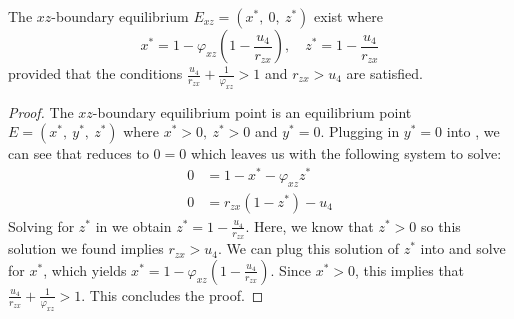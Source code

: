 \begin{theorem}\label{thm:boundary-xz-exist}
    The $xz$-boundary equilibrium $E_{xz}=\left(x^*,\ 0,\ z^*\right)$ exist where
    \begin{equation*}
        x^*=1-\varphi_{xz}\left(1-\frac{u_4}{r_{zx}}\right),\quad
        z^*=1-\frac{u_4}{r_{zx}}
    \end{equation*}
    provided that the conditions $\frac{u_4}{r_{zx}}+\frac{1}{\varphi_{xz}} > 1$ and $r_{zx}>u_4$ are satisfied.
\end{theorem}
\begin{proof}
    The $xz$-boundary equilibrium point is an equilibrium point $E=\left(x^*,\ y^*,\ z^*\right)$ where $x^*>0,\ z^*>0$ and $y^*=0$. Plugging in $y^*=0$ into , we can see that  reduces to $0=0$ which leaves us with the following system to solve:
    \begin{subequations}\label{system:xz-boundary}
        \begin{align}
            0 &= 1-x^*-\varphi_{xz}z^* \label{eq:xz-boundary-x}\\
            0 &= r_{zx}\left(1-z^*\right)-u_4 \label{eq:xz-boundary-z}
        \end{align}
    \end{subequations}
    Solving for $z^*$ in  we obtain $z^*=1-\frac{u_4}{r_{zx}}$. Here, we know that $z^*>0$ so this solution we found implies $r_{zx}>u_4$. We can plug this solution of $z^*$ into  and solve for $x^*$, which yields $x^*=1-\varphi_{xz}\left(1-\frac{u_4}{r_{zx}}\right)$. Since $x^*>0$, this implies that $\frac{u_4}{r_{zx}}+\frac{1}{\varphi_{xz}} > 1$. This concludes the proof.
\end{proof}


